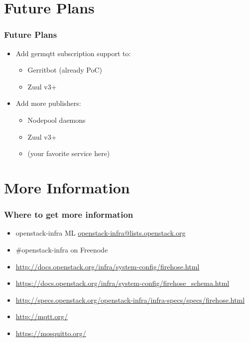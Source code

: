\documentclass[aspectratio=169,11pt,hyperref={colorlinks=true}]{beamer}
\begin{document}
\section{Future Plans}
\begin{frame}
    \frametitle{Future Plans}
    \begin{itemize}
        \item Add germqtt subscription support to:
            \begin{itemize}
                \item Gerritbot (already PoC)
                \item Zuul v3+
            \end{itemize}
        \item Add more publishers:
            \begin{itemize}
                \item Nodepool daemons
                \item Zuul v3+
                \item (your favorite service here)
            \end{itemize}
    \end{itemize}
\end{frame}

\section{More Information}
\begin{frame}
\frametitle{Where to get more information}
    \begin{itemize}
        \item openstack-infra ML\: \href{mailto:openstack-infra@lists.openstack.org}{openstack-infra@lists.openstack.org}
        \item \#openstack-infra on Freenode
	\item \href{http://docs.openstack.org/infra/system-config/firehose.html}{http://docs.openstack.org/infra/system-config/firehose.html}
    \item \href{https://docs.openstack.org/infra/system-config/firehose_schema.html}{https://docs.openstack.org/infra/system-config/firehose\_schema.html}
	\item \href{http://specs.openstack.org/openstack-infra/infra-specs/specs/firehose.html}{http://specs.openstack.org/openstack-infra/infra-specs/specs/firehose.html}
	\item \href{http://mqtt.org/}{http://mqtt.org/}
	\item \href{https://mosquitto.org/}{https://mosquitto.org/}
    \end{itemize}
\end{frame}
\end{document}
